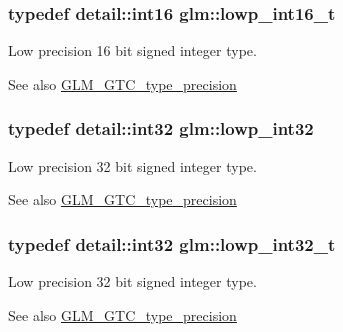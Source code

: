 \subsubsection[{\texorpdfstring{lowp\+\_\+int16\+\_\+t}{lowp_int16_t}}]{\setlength{\rightskip}{0pt plus 5cm}typedef detail\+::int16 {\bf glm\+::lowp\+\_\+int16\+\_\+t}}\hypertarget{group__gtc__type__precision_gae34c3d53c4c1434fc9f26538b0185667}{}\label{group__gtc__type__precision_gae34c3d53c4c1434fc9f26538b0185667}
Low precision 16 bit signed integer type. \begin{DoxySeeAlso}{See also}
\hyperlink{group__gtc__type__precision}{G\+L\+M\+\_\+\+G\+T\+C\+\_\+type\+\_\+precision} 
\end{DoxySeeAlso}
\subsubsection[{\texorpdfstring{lowp\+\_\+int32}{lowp_int32}}]{\setlength{\rightskip}{0pt plus 5cm}typedef detail\+::int32 {\bf glm\+::lowp\+\_\+int32}}\hypertarget{group__gtc__type__precision_gad9939c9d6fec1c6accc02a83c6500f08}{}\label{group__gtc__type__precision_gad9939c9d6fec1c6accc02a83c6500f08}
Low precision 32 bit signed integer type. \begin{DoxySeeAlso}{See also}
\hyperlink{group__gtc__type__precision}{G\+L\+M\+\_\+\+G\+T\+C\+\_\+type\+\_\+precision} 
\end{DoxySeeAlso}
\subsubsection[{\texorpdfstring{lowp\+\_\+int32\+\_\+t}{lowp_int32_t}}]{\setlength{\rightskip}{0pt plus 5cm}typedef detail\+::int32 {\bf glm\+::lowp\+\_\+int32\+\_\+t}}\hypertarget{group__gtc__type__precision_gad9567c806dc39f534174eef42663119d}{}\label{group__gtc__type__precision_gad9567c806dc39f534174eef42663119d}
Low precision 32 bit signed integer type. \begin{DoxySeeAlso}{See also}
\hyperlink{group__gtc__type__precision}{G\+L\+M\+\_\+\+G\+T\+C\+\_\+type\+\_\+precision} 
\end{DoxySeeAlso}
